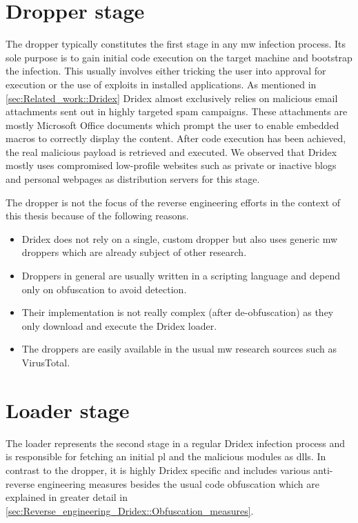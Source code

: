 \section{Dropper stage\label{sec:Reverse_engineering_Dridex::Dropper_stage}}
The dropper typically constitutes the first stage in any \gls{mw} infection process.
Its sole purpose is to gain initial code execution on the target machine and bootstrap the infection.
This usually involves either tricking the user into approval for execution or the use of exploits in installed applications.
As mentioned in \autoref{sec:Related_work::Dridex} Dridex almost exclusively relies on malicious email attachments sent out in highly targeted spam campaigns.
These attachments are mostly Microsoft Office documents which prompt the user to enable embedded macros to correctly display the content.
After code execution has been achieved, the real malicious payload is retrieved and executed.
We observed that Dridex mostly uses compromised low-profile websites such as private or inactive blogs and personal webpages as distribution servers for this stage.

The dropper is not the focus of the reverse engineering efforts in the context of this thesis because of the following reasons.
\begin{itemize}
    \item Dridex does not rely on a single, custom dropper but also uses generic \gls{mw} droppers which are already subject of other research.
    \item Droppers in general are usually written in a scripting language and depend only on obfuscation to avoid detection.
    \item Their implementation is not really complex (after de-obfuscation) as they only download and execute the Dridex loader.
    \item The droppers are easily available in the usual \gls{mw} research sources such as VirusTotal.
\end{itemize}

\section{Loader stage\label{sec:Reverse_engineering_Dridex::Loader_stage}}
The loader represents the second stage in a regular Dridex infection process and is responsible for fetching an initial \gls{pl} and the malicious modules as \glspl{dll}.
In contrast to the dropper, it is highly Dridex specific and includes various anti-reverse engineering measures besides the usual code obfuscation which are explained in greater detail in \autoref{sec:Reverse_engineering_Dridex::Obfuscation_measures}.

